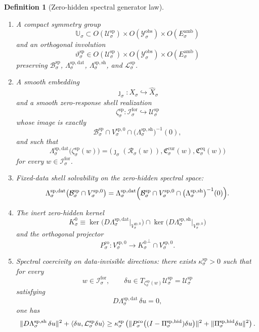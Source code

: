 \documentclass[11pt]{article}
\newcommand{\ForSpace}[1]{\mathcal I_{#1}^{\mathrm{for}}}
\newcommand{\Reduction}[1]{\mathcal R_{#1}}
\newcommand{\CurrentCarrier}[1]{\mathfrak C_{#1}^{\mathrm{cur}}}
\newcommand{\EqCarrier}[1]{\mathfrak C_{#1}^{\mathrm{eq}}}
\newcommand{\VisibleAffine}[1]{\widehat X_{#1}}
\newcommand{\DataSpace}[1]{\mathcal Y_{#1}^{\mathrm{obs}}}
\newcommand{\AmbientTarget}[1]{E_{#1}^{\mathrm{amb}}}
\newcommand{\Kernel}[1]{K_{#1}^{0}}
\newcommand{\StateComp}[1]{P_{#1}^{\mathrm{co}}}
\newcommand{\SpecSpace}[1]{\mathcal U_{#1}^{\mathrm{sp}}}
\newcommand{\SpecBody}[1]{\mathcal B_{#1}^{\mathrm{sp}}}
\newcommand{\SpecData}[1]{\Lambda_{#1}^{\mathrm{sp,dat}}}
\newcommand{\SpecShell}[1]{\Lambda_{#1}^{\mathrm{sp,sh}}}
\newcommand{\SpecOp}[1]{\mathcal L_{#1}^{\mathrm{sp}}}
\newcommand{\SpecZero}[1]{V_{#1}^{\mathrm{sp},0}}
\newcommand{\SpecHidden}[1]{H_{#1}^{\mathrm{sp}}}
\newcommand{\SpecProj}[1]{\Pi_{#1}^{\mathrm{sp,hid}}}
\newcommand{\SpecSym}[1]{\mathbb U_{#1}}
\newcommand{\SpecTime}[1]{\vartheta_{#1}^{\mathrm{sp}}}
\newcommand{\SpecEmbed}[1]{\zeta_{#1}^{\mathrm{sp}}}
\newtheorem{definition}{Definition}
\begin{document}
\begin{definition}[Zero-hidden spectral generator law]
\begin{enumerate}
\begin{equation}
    \|\eta\|^{2}
    \qquad
    \text{for all }\eta\in\SpecHidden{\sigma}.
    \label{eq:specgap}
    \end{equation}
    \item A compact symmetry group
    \[
    \SpecSym{\sigma}\subset
    O(\SpecSpace{\sigma})\times
    O(\DataSpace{\sigma})\times
    O(\AmbientTarget{\sigma})
    \]
    and an orthogonal involution
    \[
    \SpecTime{\sigma}\in
    O(\SpecSpace{\sigma})\times
    O(\DataSpace{\sigma})\times
    O(\AmbientTarget{\sigma})
    \]
    preserving \(\SpecBody{\sigma}\), \(\SpecData{\sigma}\), \(\SpecShell{\sigma}\), and \(\SpecOp{\sigma}\).
    \item A smooth embedding
    \[
    \jmath_{\sigma}:X_{\sigma}\hookrightarrow\VisibleAffine{\sigma}
    \]
    and a smooth zero-response shell realization
    \[
    \SpecEmbed{\sigma}:\ForSpace{\sigma}\hookrightarrow\SpecSpace{\sigma}
    \]
    whose image is exactly
    \[
    \SpecBody{\sigma}\cap
    \SpecZero{\sigma}\cap
    \bigl(\SpecShell{\sigma}\bigr)^{-1}(0),
    \]
    and such that
    \begin{equation}
    \SpecData{\sigma}\bigl(\SpecEmbed{\sigma}(w)\bigr)
    =
    \bigl(
    \jmath_{\sigma}(\Reduction{\sigma}(w)),
    \CurrentCarrier{\sigma}(w),
    \EqCarrier{\sigma}(w)
    \bigr)
    \label{eq:speccompat}
    \end{equation}
    for every \(w\in\ForSpace{\sigma}\).
    \item Fixed-data shell solvability on the zero-hidden spectral space:
    \begin{equation}
    \SpecData{\sigma}\bigl(
    \SpecBody{\sigma}\cap\SpecZero{\sigma}
    \bigr)
    =
    \SpecData{\sigma}\Bigl(
    \SpecBody{\sigma}\cap
    \SpecZero{\sigma}\cap
    \bigl(\SpecShell{\sigma}\bigr)^{-1}(0)
    \Bigr).
    \label{eq:specsolvability}
    \end{equation}
    \item The inert zero-hidden kernel
    \[
    \Kernel{\sigma}
    \equiv
    \ker\bigl(D\SpecData{\sigma}\big|_{\SpecZero{\sigma}}\bigr)
    \cap
    \ker\bigl(D\SpecShell{\sigma}\big|_{\SpecZero{\sigma}}\bigr)
    \]
    and the orthogonal projector
    \[
    \StateComp{\sigma}:
    \SpecZero{\sigma}\to
    {\Kernel{\sigma}}^{\perp}\cap\SpecZero{\sigma}.
    \]
    \item Spectral coercivity on data-invisible directions: there exists \(\kappa_{\sigma}^{\mathrm{sp}}>0\) such that for every
    \[
    w\in\ForSpace{\sigma},
    \qquad
    \delta u\in T_{\SpecEmbed{\sigma}(w)}\SpecSpace{\sigma}=\SpecSpace{\sigma}
    \]
    satisfying
    \[
    D\SpecData{\sigma}\,\delta u=0,
    \]
    one has
    \begin{equation}
    \|D\SpecShell{\sigma}\,\delta u\|^{2}
    +
    \ev{\delta u,\SpecOp{\sigma}\delta u}
    \ge
    \kappa_{\sigma}^{\mathrm{sp}}
    \left(
    \|\StateComp{\sigma}\bigl((I-\SpecProj{\sigma})\delta u\bigr)\|^{2}
    +
    \|\SpecProj{\sigma}\delta u\|^{2}
    \right).
    \label{eq:speccoercive}
    \end{equation}
\end{enumerate}
\end{definition}
\end{document}
